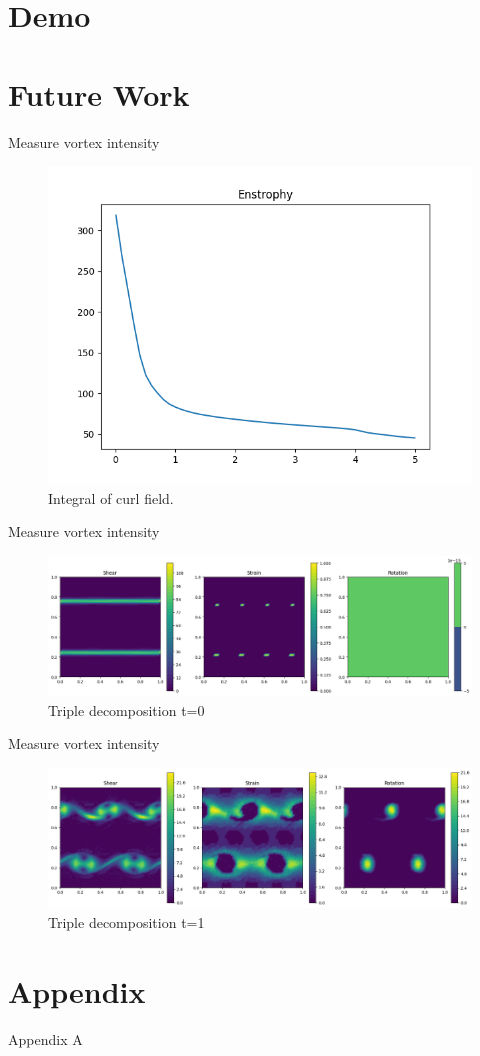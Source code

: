 \documentclass[17pt, t, lualatex]{beamer}
\begin{document}
\section{Demo}
\insertsectionpage
\section{Future Work}
\begin{frame}{Measure vortex intensity}
\begin{figure}
    \centering
    \includegraphics[width=.5\linewidth]{imgs/enstrophy}
    \caption{Integral of curl field.}
    \label{fig:enstrophy}
\end{figure}
\end{frame}

\begin{frame}{Measure vortex intensity}
\begin{figure}
    \centering
    \includegraphics[width=1\linewidth]{imgs/rotation1}
    \caption{Triple decomposition t=0}
    \label{fig:triple_decomp1}
\end{figure}
\end{frame}
\begin{frame}{Measure vortex intensity}
\begin{figure}
    \centering
    \includegraphics[width=1\linewidth]{imgs/rotation2}
    \caption{Triple decomposition t=1}
    \label{fig:triple_decomp2}
\end{figure}
\end{frame}
\insertendpage

\section{Appendix}
\insertsectionpage
\begin{frame}{Appendix A}
\end{frame}
\end{document}
